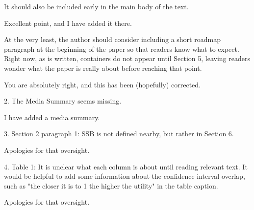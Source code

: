 \begin{referee}
  It should also be included
early in the main body of the text. \end{referee}

\begin{response}
   Excellent point, and I have added it there.
\end{response}


\begin{referee}
At the very least, the author should consider including a short
roadmap paragraph at the beginning of the paper so that readers know what to expect. Right now, as
is written, containers do not appear until Section 5, leaving readers wonder what the paper is really
about before reaching that point.
\end{referee}

\begin{response}
    You are absolutely right, and this has been (hopefully) corrected.
\end{response}


\begin{referee}

2.
The Media Summary seems missing.

\end{referee}

\begin{response}
    I have added a media summary.
\end{response}


\begin{referee}

3.
Section 2 paragraph 1: SSB is not defined nearby, but rather in Section 6.

\end{referee}

\begin{response}
    Apologies for that oversight.
\end{response}


\begin{referee}
4.
Table 1: It is unclear what each column is about until reading relevant text. It would be helpful to
add some information about the confidence interval overlap, such as "the closer it is to 1 the higher
the utility" in the table caption.
\end{referee}

\begin{response}
    Apologies for that oversight.
\end{response}



